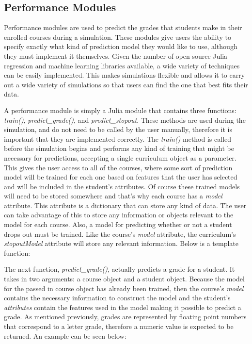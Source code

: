\documentclass[botnum, fleqn]{unmeethesis}
\begin{document}
    \subsection{Performance Modules}
      Performance modules are used to predict the grades that students make in their enrolled courses during a simulation. These modules give users the ability to specify exactly what kind of prediction model they would like to use, although they must implement it themselves. Given the number of open-source Julia regression and machine learning libraries available, a wide variety of techniques can be easily implemented. This makes simulations flexible and allows it to carry out a wide variety of simulations so that users can find the one that best fits their data. 

      A performance module is simply a Julia module that contains three functions: \textit{train()}, \textit{predict\_grade()}, and \textit{predict\_stopout}. These methods are used during the simulation, and do not need to be called by the user manually, therefore it is important that they are implemented correctly. The \textit{train()} method is called before the simulation begins and performs any kind of training that might be necessary for predictions, accepting a single curriculum object as a parameter. This gives the user access to all of the courses, where some sort of prediction model will be trained for each one based on features that the user has selected and will be included in the student's attributes. Of course these trained models will need to be stored somewhere and that's why each course has a \textit{model} attribute. This attribute is a dictionary that can store any kind of data. The user can take advantage of this to store any information or objects relevant to the model for each course. Also, a model for predicting whether or not a student drops out must be trained. Like the course's \textit{model} attribute, the curriculum's \textit{stopoutModel} attribute will store any relevant information. Below is a template function:

      

      The next function, \textit{predict\_grade()}, actually predicts a grade for a student. It takes in two arguments: a course object and a student object. Because the model for the passed in course object has already been trained, then the course's \textit{model} contains the necessary information to construct the model and the student's \textit{attributes} contain the features used in the model making it possible to predict a grade. As mentioned previously, grades are represented by floating point numbers that correspond to a letter grade, therefore a numeric value is expected to be returned. An example can be seen below:
\end{document}
